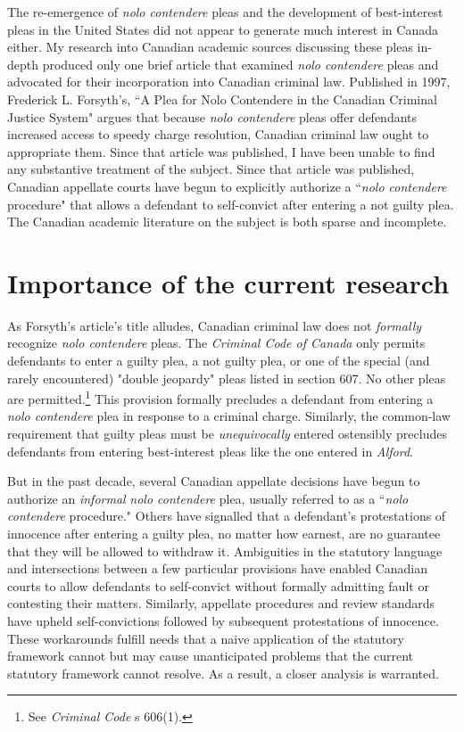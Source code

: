 The re-emergence of \textit{nolo contendere} pleas and the development of best-interest pleas in the United States did not appear to generate much interest in Canada either. My research into Canadian academic sources discussing these pleas in-depth produced only one brief article that examined \textit{nolo contendere} pleas and advocated for their incorporation into Canadian criminal law. Published in 1997, Frederick L. Forsyth's, ``A Plea for Nolo Contendere in the Canadian Criminal Justice System" argues that because \textit{nolo contendere} pleas offer defendants increased access to speedy charge resolution, Canadian criminal law ought to appropriate them. Since that article was published, I have been unable to find any substantive treatment of the subject. Since that article was published, Canadian appellate courts have begun to explicitly authorize a ``\textit{nolo contendere} procedure" that allows a defendant to self-convict after entering a not guilty plea. The Canadian academic literature on the subject is both sparse and incomplete.

\section{Importance of the current research}

As Forsyth's article's title alludes, Canadian criminal law does not \textit{formally} recognize \textit{nolo contendere} pleas. The \textit{Criminal Code of Canada} only permits defendants to enter a guilty plea, a not guilty plea, or one of the special (and rarely encountered) "double jeopardy" pleas listed in section 607. No other pleas are permitted.\footnote{See \textit{Criminal Code} s 606(1).} This provision formally precludes a defendant from entering a \textit{nolo contendere} plea in response to a criminal charge. Similarly, the common-law requirement that guilty pleas must be \textit{unequivocally} entered ostensibly precludes defendants from entering best-interest pleas like the one entered in \textit{Alford}.

But in the past decade, several Canadian appellate decisions have begun to authorize an \textit{informal} \textit{nolo contendere} plea, usually referred to as a ``\textit{nolo contendere} procedure." Others have signalled that a defendant's protestations of innocence after entering a guilty plea, no matter how earnest, are no guarantee that they will be allowed to withdraw it. Ambiguities in the statutory language and intersections between a few particular provisions have enabled Canadian courts to allow defendants to self-convict without formally admitting fault or contesting their matters. Similarly, appellate procedures and review standards have upheld self-convictions followed by subsequent protestations of innocence. These workarounds fulfill needs that a naive application of the statutory framework cannot but may cause unanticipated problems that the current statutory framework cannot resolve. As a result, a closer analysis is warranted.

